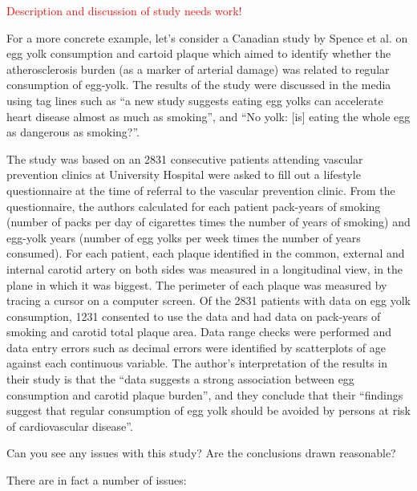 \textcolor{red}{Description and discussion of study needs work!}


For a more concrete example, let's consider a Canadian study by Spence et al. on egg yolk consumption and cartoid plaque which aimed to identify whether the atherosclerosis burden (as a marker of arterial damage) was related to regular consumption of egg-yolk. The results of the study were discussed in the media using tag lines such as ``a new study suggests eating egg yolks can accelerate heart disease almost as much as smoking'', and ``No yolk: [is] eating the whole egg as dangerous as smoking?''.

The study was based on an 2831 consecutive patients attending vascular prevention clinics at University Hospital were asked to fill out a lifestyle questionnaire at the time of referral to the vascular prevention clinic. From the questionnaire, the authors calculated for each patient pack-years of smoking (number of packs per day of cigarettes times the number of years of smoking) and egg-yolk years (number of egg yolks per week times the number of years consumed). For each patient, each plaque identified in the common, external and internal carotid artery on both sides was measured in a longitudinal view, in the plane in which it was biggest. The perimeter of each plaque was measured by tracing a cursor on a computer screen. Of the 2831 patients with data on egg yolk consumption, 1231 consented to use the data and had data on pack-years of smoking and carotid total plaque area. Data range checks were performed and data entry errors such as decimal errors were identified by scatterplots of age against each continuous variable. The author's interpretation of the results in their study is that the ``data suggests a strong association between egg consumption and carotid plaque burden'', and they conclude that their ``findings suggest that regular consumption of egg yolk should be avoided by persons at risk of cardiovascular disease''.



Can you see any issues with this study? Are the conclusions drawn reasonable?


There are in fact a number of issues:

